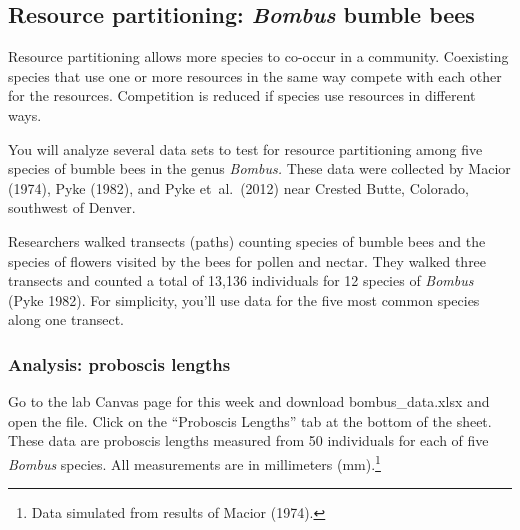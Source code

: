 \documentclass[12pt, hidelinks, twoside]{exam}
\begin{document}
\subsection*{Resource partitioning: \textit{Bombus} bumble bees}

Resource partitioning allows more species to co-occur in a community.
Coexisting species that use one or more resources in the same way compete
with each other for the resources. Competition is reduced if species
use resources in different ways.



You will analyze several data sets to test for resource partitioning among five
species of bumble bees in the genus \textit{Bombus.} These data were collected
by Macior (1974), Pyke (1982), and Pyke et~al.~(2012) near Crested Butte, Colorado,
southwest of Denver.

Researchers walked transects (paths) counting species of bumble bees and the 
species of flowers visited by the bees for pollen and nectar. They walked
three transects and counted a total of 13,136 individuals for 12 species of 
\textit{Bombus} (Pyke 1982). For simplicity, you'll use data for the five most common 
species along one transect.


\subsubsection*{Analysis: proboscis lengths}

Go to the lab Canvas page for this week and download bombus\_data.xlsx and open the file. Click on the “Proboscis Lengths” tab at the bottom of the sheet. These data are
 proboscis lengths measured from 50 individuals for each of five \textit{Bombus} species. All measurements are in millimeters (mm).\footnote{Data simulated  from results of Macior (1974).}
\end{document}
